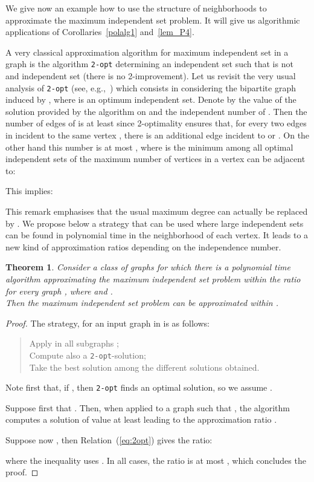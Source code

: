 \documentclass[final]{dmtcs-episciences}
\newtheorem{theorem}{Theorem}
\begin{document}
We give now an example how to use the structure of neighborhoods to approximate the maximum independent set problem. It will give us algorithmic  applications of  Corollaries~\ref{polalg1} and~\ref{lem_P4}. 

A very classical approximation algorithm for maximum independent set in a graph  is the  algorithm {\tt 2-opt} determining an independent set  such that  is not and independent set (there is no 2-improvement). Let us revisit the very usual analysis of {\tt 2-opt} (see, e.g.,~\citet{ejorapprox})  which consists in considering the bipartite graph  induced by , where  is an optimum independent set. Denote by  the value of the solution provided by the algorithm on  and 
 the independent number of . Then the number of edges of  is at least  since 2-optimality ensures that, for every two edges  in  incident to the same vertex   , there is an additional edge incident to  or . On the other hand this number is at most , where  is
the minimum among all optimal independent sets  of the maximum number of vertices in  a vertex can be adjacent to:
  
This implies:

 This remark emphasises that the usual maximum degree can actually be replaced by .
 We propose below a strategy that can be used where large independent sets can be found in polynomial time in the neighborhood of each vertex. It leads to a new kind of approximation ratios depending on the independence number.
 \begin{theorem}\label{th:approx}
Consider a class of graphs  for which there is a polynomial time algorithm  approximating the maximum independent set problem within the ratio  for every graph , where  and  .\\
 Then  the maximum independent set problem can be approximated within .\end{theorem}
 \begin{proof}
 The strategy, for an input graph  in  is as follows: 
 \begin{quote}
  Apply  in all subgraphs ;\\ 
  Compute also a {\tt 2-opt}-solution;\\
 Take the best solution among the  different solutions obtained.
  \end{quote}
  Note first that, if , then {\tt 2-opt} finds an optimal solution, so we assume .
  
Suppose first that . Then, when applied to a graph  such that , the algorithm  computes a solution of value at least  leading to the approximation ratio  .

Suppose now , then Relation~(\ref{eq:2opt}) gives the ratio: 

where the inequality uses . 
In all cases, the ratio is at most ,
 which concludes the proof.
\end{proof}
\end{document}
